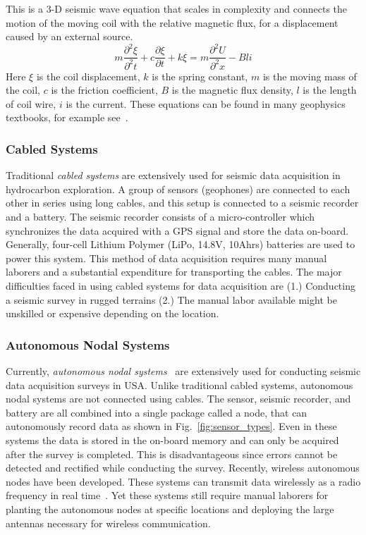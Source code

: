  This is a $3$-D seismic wave equation that scales in complexity and connects the motion of the moving coil with the relative magnetic flux, for a displacement caused by an external source.
\begin{equation}
m\frac{\partial^{2}{\xi}}{\partial^{2}{t}}+c\frac{\partial{\xi}}{\partial{t}}+k\xi = m\frac{\partial^{2}{U}}{\partial^{2}{x}}-Bli
\end{equation} 
Here $\xi$ is the coil displacement, $k$ is the spring constant, $m$ is the moving mass of the coil, $c$ is the friction coefficient, $B$ is the magnetic flux density, $l$ is the length of coil wire, $i$ is the current. These equations can be found in many geophysics textbooks, for example see~\cite{shearer2009introduction}.
\subsubsection{Cabled Systems}
 Traditional \emph{cabled systems} are extensively used for seismic data acquisition in hydrocarbon exploration. A group of sensors (geophones) are connected to each other in series using long cables, and this setup is connected to a seismic recorder and a battery. The seismic recorder consists of a micro-controller which synchronizes the data acquired with a GPS signal and store the data on-board. Generally, four-cell Lithium Polymer (LiPo, 14.8V, 10Ahrs) batteries are used to power this system. This method of data acquisition requires many manual laborers and a substantial expenditure for transporting the cables. The major difficulties faced in using cabled systems for data acquisition are (1.) Conducting a seismic survey in rugged terrains (2.) The manual labor available might be unskilled or expensive depending on the location.  
 \subsubsection{Autonomous Nodal Systems}
 Currently, \emph{autonomous nodal systems}~\cite{wood1998distributed} are extensively used for conducting seismic data acquisition surveys in USA. Unlike traditional cabled systems, autonomous nodal systems are not connected using cables. The sensor, seismic recorder, and battery are all combined into a single package called a node, that can autonomously record data as shown in Fig.~\ref{fig:sensor_types}. Even in these systems the data is stored in the on-board memory and can only be acquired after the survey is completed. This is disadvantageous since errors cannot be detected and rectified while conducting the survey. Recently, wireless autonomous nodes have been developed. These systems can transmit data wirelessly as a radio frequency in real time~\cite{jiang2015geophysical}. Yet these systems still require manual laborers for planting the autonomous nodes at specific locations and deploying the large antennas necessary for wireless communication.
